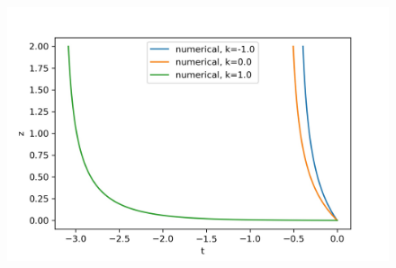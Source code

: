 \documentclass[a4paper, 11pt]{FSKH_623_Report}
\numberwithin{equation}{section}
\begin{document}
\begin{figure}[H]
\centering
\includegraphics[scale=1]{Figures/z_ch.jpg}
\caption{}
\end{figure}
\end{document}
